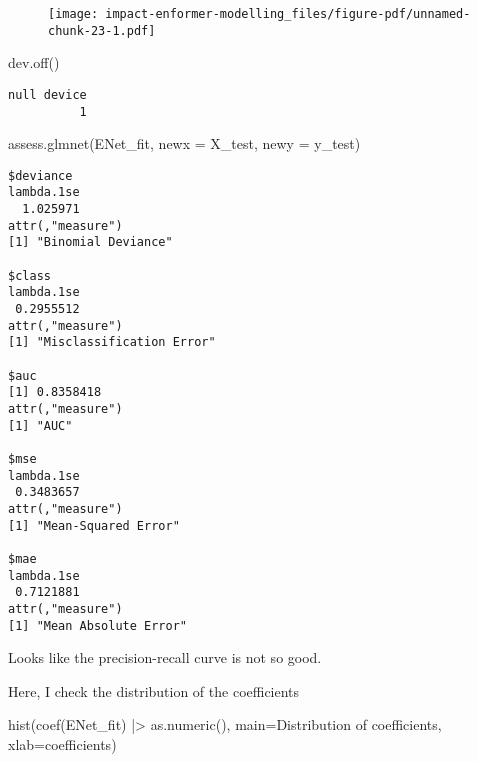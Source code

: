 \documentclass[
  letterpaper,
  DIV=11,
  numbers=noendperiod]{scrartcl}
\newenvironment{Shaded}{\begin{snugshade}}{\end{snugshade}}
\newcommand{\AttributeTok}[1]{\textcolor[rgb]{0.40,0.45,0.13}{#1}}
\newcommand{\FunctionTok}[1]{\textcolor[rgb]{0.28,0.35,0.67}{#1}}
\newcommand{\NormalTok}[1]{\textcolor[rgb]{0.00,0.23,0.31}{#1}}
\newcommand{\SpecialCharTok}[1]{\textcolor[rgb]{0.37,0.37,0.37}{#1}}
\newcommand{\StringTok}[1]{\textcolor[rgb]{0.13,0.47,0.30}{#1}}
\begin{document}
\begin{figure}[H]

{\centering \texttt{[image: impact-enformer-modelling\_files/figure-pdf/unnamed-chunk-23-1.pdf]}

}

\end{figure}

\begin{Shaded}
\begin{Highlighting}[]
\FunctionTok{dev.off}\NormalTok{()}
\end{Highlighting}
\end{Shaded}

\begin{verbatim}
null device 
          1 
\end{verbatim}

\begin{Shaded}
\begin{Highlighting}[]
\FunctionTok{assess.glmnet}\NormalTok{(ENet\_fit, }\AttributeTok{newx =}\NormalTok{ X\_test, }\AttributeTok{newy =}\NormalTok{ y\_test)}
\end{Highlighting}
\end{Shaded}

\begin{verbatim}
$deviance
lambda.1se 
  1.025971 
attr(,"measure")
[1] "Binomial Deviance"

$class
lambda.1se 
 0.2955512 
attr(,"measure")
[1] "Misclassification Error"

$auc
[1] 0.8358418
attr(,"measure")
[1] "AUC"

$mse
lambda.1se 
 0.3483657 
attr(,"measure")
[1] "Mean-Squared Error"

$mae
lambda.1se 
 0.7121881 
attr(,"measure")
[1] "Mean Absolute Error"
\end{verbatim}

Looks like the precision-recall curve is not so good.

Here, I check the distribution of the coefficients

\begin{Shaded}
\begin{Highlighting}[]
\FunctionTok{hist}\NormalTok{(}\FunctionTok{coef}\NormalTok{(ENet\_fit) }\SpecialCharTok{|\textgreater{}} \FunctionTok{as.numeric}\NormalTok{(), }\AttributeTok{main=}\StringTok{\textquotesingle{}Distribution of coefficients\textquotesingle{}}\NormalTok{, }\AttributeTok{xlab=}\StringTok{\textquotesingle{}coefficients\textquotesingle{}}\NormalTok{)}
\end{Highlighting}
\end{Shaded}
\end{document}
